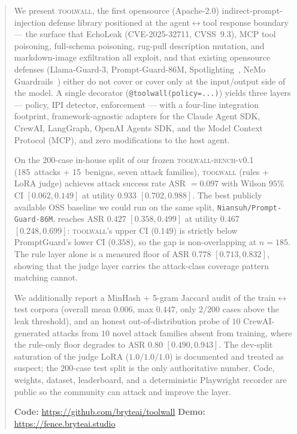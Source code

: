 \begin{abstract}
We present \textsc{toolwall}, the first opensource (Apache-2.0)
indirect-prompt-injection defense library positioned at the
agent$\leftrightarrow$tool response boundary --- the surface that
EchoLeak (CVE-2025-32711, CVSS~9.3), MCP tool poisoning,
full-schema poisoning, rug-pull description mutation, and
markdown-image exfiltration all exploit, and that existing
opensource defenses (Llama-Guard-3, Prompt-Guard-86M,
Spotlighting~\cite{hines2024spotlight}, NeMo
Guardrails~\cite{nemoguard2024}) either do not cover or cover
only at the input/output side of the model. A single decorator
(\verb|@toolwall(policy=...)|) yields three layers --- policy,
IPI detector, enforcement --- with a four-line integration
footprint, framework-agnostic adapters for the Claude Agent SDK,
CrewAI, LangGraph, OpenAI Agents SDK, and the Model Context
Protocol (MCP), and zero modifications to the host agent.

On the 200-case in-house split of our frozen
\textsc{toolwall-bench-v0.1} (185~attacks + 15~benigns, seven
attack families), \textsc{toolwall} (rules + LoRA judge) achieves
attack success rate ASR $= 0.097$ with Wilson $95\%$ CI
$[0.062, 0.149]$ at utility $0.933$ $[0.702, 0.988]$. The best
publicly available OSS baseline we could run on the same split,
\texttt{Niansuh/Prompt-Guard-86M}, reaches ASR $0.427$ $[0.358,
0.499]$ at utility $0.467$ $[0.248, 0.699]$: \textsc{toolwall}'s
upper CI ($0.149$) is strictly below PromptGuard's lower CI
($0.358$), so the gap is non-overlapping at $n=185$. The rule
layer alone is a measured floor of ASR $0.778$ $[0.713, 0.832]$,
showing that the judge layer carries the attack-class coverage
pattern matching cannot.

We additionally report a MinHash + 5-gram Jaccard audit of the
train$\leftrightarrow$test corpora (overall mean $0.006$, max
$0.447$, only $2/200$ cases above the leak threshold), and an
honest out-of-distribution probe of $10$ CrewAI-generated attacks
from $10$ novel attack families absent from training, where the
rule-only floor degrades to ASR $0.80$ $[0.490, 0.943]$. The
dev-split saturation of the judge LoRA ($1.0/1.0/1.0$) is
documented and treated as suspect; the $200$-case test split is
the only authoritative number. Code, weights, dataset,
leaderboard, and a deterministic Playwright recorder are public
so the community can attack and improve the layer.

\noindent\textbf{Code:} \url{https://github.com/bryteai/toolwall}
\quad
\textbf{Demo:} \url{https://fence.bryteai.studio}
\end{abstract}

